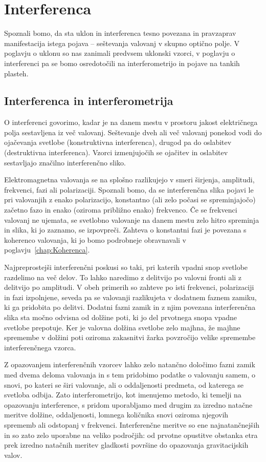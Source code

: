 
\chapter{Interferenca}
\label{chap:Interferenca}
Spoznali bomo, da sta uklon in interferenca tesno povezana in pravzaprav
manifestacija istega pojava -- seštevanja  valovanj v 
skupno optično polje. V poglavju o uklonu so nas zanimali predvsem uklonski 
vzorci, v poglavju o interferenci pa se bomo osredotočili na interferometrijo 
in pojave na tankih plasteh.

\section{Interferenca in interferometrija}
O interferenci govorimo, kadar je na danem mestu v 
prostoru jakost električnega polja sestavljena iz 
več valovanj. Seštevanje 
dveh ali več valovanj ponekod vodi
do ojačevanja svetlobe (konstruktivna interferenca), 
drugod pa do oslabitev (destruktivna interferenca). 
Vzorci izmenjujočih se ojačitev in oslabitev sestavljajo
značilno interferenčno sliko.

Elektromagnetna valovanja se na splošno razlikujejo 
v smeri širjenja, amplitudi, frekvenci, fazi ali polarizaciji. 
Spoznali bomo, da se interferenčna slika pojavi le pri valovanjih z enako
polarizacijo, konstantno (ali zelo počasi se spreminjajočo)
začetno fazo in enako (oziroma približno enako) frekvenco. 
Če se frekvenci valovanj ne ujemata, se svetlobno valovanje na 
danem mestu zelo hitro spreminja in slika, ki jo zaznamo, se izpovpreči.
Zahteva o konstantni fazi je povezana s koherenco valovanja, 
ki jo bomo podrobneje obravnavali v poglavju~\ref{chap:Koherenca}. 

Najpreprostejši interferenčni poskusi so taki, pri katerih vpadni snop svetlobe
razdelimo na več delov. To lahko naredimo z delitvijo po valovni fronti
ali z delitvijo po amplitudi. V obeh primerih so zahteve po isti frekvenci, 
polarizaciji in fazi izpolnjene, seveda pa se valovanji razlikujeta 
v dodatnem faznem zamiku, ki ga pridobita po delitvi.
Dodatni fazni zamik in z njim povezana interferenčna slika 
sta močno odvisna od dolžine poti, ki jo del prvotnega snopa 
vpadne svetlobe prepotuje. Ker je valovna dolžina svetlobe zelo majhna, že majhne 
spremembe v dolžini poti oziroma zakasnitvi žarka povzročijo velike spremembe 
interferenčnega vzorca. 

Z opazovanjem interferenčnih vzorcev lahko zelo natančno določimo fazni zamik med
dvema deloma valovanja in s tem pridobimo podatke o valovanju samem, o snovi, po 
kateri se širi valovanje, ali o oddaljenosti predmeta, od katerega se svetloba odbija. 
Zato interferometrijo, kot imenujemo metodo, ki temelji na opazovanju interference,
s pridom uporabljamo med drugim za izredno natačne meritve dolžine, 
oddaljenosti, lomnega količnika snovi oziroma njegovih sprememb ali odstopanj v frekvenci. 
Interferenčne meritve so ene najnatančnejših in so zato zelo uporabne na veliko področjih:
od prvotne opustitve obstanka etra prek izredno natačnih meritev gladkosti površine do
opazovanja gravitacijskih valov. 

